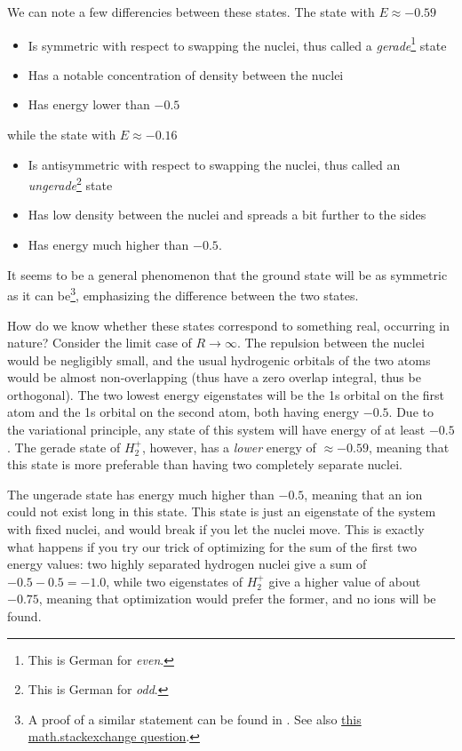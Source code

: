 \documentclass{article}
\begin{document}
We can note a few differencies between these states. The state with \(E\approx-0.59\)

\begin{itemize}
\item Is symmetric with respect to swapping the nuclei, thus called a \textit{gerade}\footnote{This is German for \textit{even}.} state
\item Has a notable concentration of density between the nuclei
\item Has energy lower than \(-0.5\)
\end{itemize}

while the state with \(E\approx-0.16\)

\begin{itemize}
\item Is antisymmetric with respect to swapping the nuclei, thus called an \textit{ungerade}\footnote{This is German for \textit{odd}.} state
\item Has low density between the nuclei and spreads a bit further to the sides
\item Has energy much higher than \(-0.5\).
\end{itemize}

It seems to be a general phenomenon that the ground state will be as symmetric as it can be\footnote{A proof of a similar statement can be found in \cite{ref:lieb}. See also \href{https://math.stackexchange.com/questions/3564003/if-psi-is-an-eigenvector-of-delta-is-psi-an-eigenvector-as-well}{this math.stackexchange question}.}, emphasizing the difference between the two states.

 How do we know whether these states correspond to something real, occurring in nature? Consider the limit case of \(R \rightarrow \infty\). The repulsion between the nuclei would be negligibly small, and the usual hydrogenic orbitals of the two atoms would be almost non-overlapping (thus have a zero overlap integral, thus be orthogonal). The two lowest energy eigenstates will be the 1s orbital on the first atom and the 1s orbital on the second atom, both having energy \(-0.5\). Due to the variational principle, any state of this system will have energy of at least \(-0.5\). The gerade state of \(H_2^+\), however, has a \textit{lower} energy of \(\approx-0.59\), meaning that this state is more preferable than having two completely separate nuclei.

 The ungerade state has energy much higher than \(-0.5\), meaning that an ion could not exist long in this state. This state is just an eigenstate of the system with fixed nuclei, and would break if you let the nuclei move. This is exactly what happens if you try our trick of optimizing for the sum of the first two energy values: two highly separated hydrogen nuclei give a sum of \(-0.5-0.5=-1.0\), while two eigenstates of \(H_2^+\) give a higher value of about \(-0.75\), meaning that optimization would prefer the former, and no ions will be found.
\end{document}
